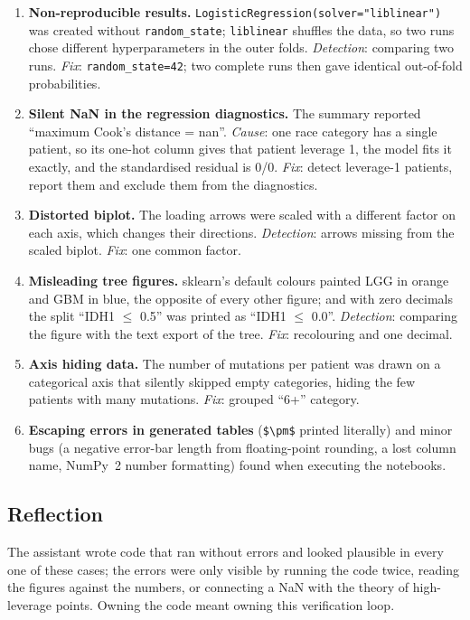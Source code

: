 \begin{enumerate}
  \item \textbf{Non-reproducible results.} \texttt{LogisticRegression(solver="liblinear")} was created
        without \texttt{random\_state}; \texttt{liblinear} shuffles the data, so two runs chose different
        hyperparameters in the outer folds. \emph{Detection}: comparing two runs. \emph{Fix}:
        \texttt{random\_state=42}; two complete runs then gave identical out-of-fold probabilities.
  \item \textbf{Silent NaN in the regression diagnostics.} The summary reported ``maximum Cook's
        distance = nan''. \emph{Cause}: one race category has a single patient, so its one-hot column
        gives that patient leverage 1, the model fits it exactly, and the standardised residual is 0/0.
        \emph{Fix}: detect leverage-1 patients, report them and exclude them from the diagnostics.
  \item \textbf{Distorted biplot.} The loading arrows were scaled with a different factor on each axis,
        which changes their directions. \emph{Detection}: arrows missing from the scaled biplot.
        \emph{Fix}: one common factor.
  \item \textbf{Misleading tree figures.} sklearn's default colours painted LGG in orange and GBM in
        blue, the opposite of every other figure; and with zero decimals the split ``IDH1 $\leq$ 0.5''
        was printed as ``IDH1 $\leq$ 0.0''. \emph{Detection}: comparing the figure with the text export of
        the tree. \emph{Fix}: recolouring and one decimal.
  \item \textbf{Axis hiding data.} The number of mutations per patient was drawn on a categorical axis
        that silently skipped empty categories, hiding the few patients with many mutations.
        \emph{Fix}: grouped ``6+'' category.
  \item \textbf{Escaping errors in generated tables} (\texttt{\$\textbackslash pm\$} printed literally)
        and minor bugs (a negative error-bar length from floating-point rounding, a lost column name,
        NumPy~2 number formatting) found when executing the notebooks.
\end{enumerate}

\subsection*{Reflection}

The assistant wrote code that ran without errors and looked plausible in every one of these cases; the
errors were only visible by running the code twice, reading the figures against the numbers, or
connecting a NaN with the theory of high-leverage points. Owning the code meant owning this
verification loop.
